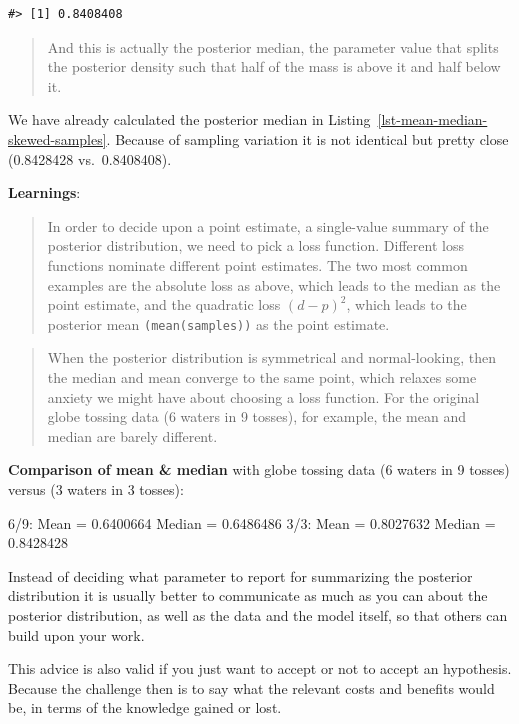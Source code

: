\documentclass[
  letterpaper,
  DIV=11,
  numbers=noendperiod]{scrreprt}
\begin{document}
\begin{verbatim}
#> [1] 0.8408408
\end{verbatim}

\begin{quote}
And this is actually the posterior median, the parameter value that
splits the posterior density such that half of the mass is above it and
half below it.
\end{quote}

We have already calculated the posterior median in
Listing~\ref{lst-mean-median-skewed-samples}. Because of sampling
variation it is not identical but pretty close (0.8428428
vs.~0.8408408).

\textbf{Learnings}:

\begin{quote}
In order to decide upon a point estimate, a single-value summary of the
posterior distribution, we need to pick a loss function. Different loss
functions nominate different point estimates. The two most common
examples are the absolute loss as above, which leads to the median as
the point estimate, and the quadratic loss \((d - p)^{2}\), which leads
to the posterior mean \texttt{(mean(samples))} as the point estimate.
\end{quote}

\begin{quote}
When the posterior distribution is symmetrical and normal-looking, then
the median and mean converge to the same point, which relaxes some
anxiety we might have about choosing a loss function. For the original
globe tossing data (6 waters in 9 tosses), for example, the mean and
median are barely different.
\end{quote}

\textbf{Comparison of mean \& median} with globe tossing data (6 waters
in 9 tosses) versus (3 waters in 3 tosses):

6/9: Mean = 0.6400664 Median = 0.6486486 3/3: Mean = 0.8027632 Median =
0.8428428

\begin{tcolorbox}[enhanced jigsaw, colframe=quarto-callout-important-color-frame, colback=white, toprule=.15mm, breakable, arc=.35mm, bottomtitle=1mm, colbacktitle=quarto-callout-important-color!10!white, toptitle=1mm, titlerule=0mm, title=\textcolor{quarto-callout-important-color}{\faExclamation}\hspace{0.5em}{Important}, leftrule=.75mm, opacityback=0, rightrule=.15mm, opacitybacktitle=0.6, bottomrule=.15mm, left=2mm, coltitle=black]

Instead of deciding what parameter to report for summarizing the
posterior distribution it is usually better to communicate as much as
you can about the posterior distribution, as well as the data and the
model itself, so that others can build upon your work.

This advice is also valid if you just want to accept or not to accept an
hypothesis. Because the challenge then is to say what the relevant costs
and benefits would be, in terms of the knowledge gained or lost.

\end{tcolorbox}
\end{document}
